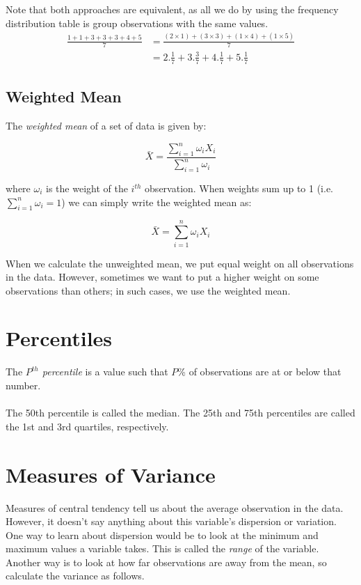 \documentclass{./../../Latex/handout}
\begin{document}
 Note that both approaches are equivalent, as all we do by using the frequency distribution table is group observations with the same values. 
 \begin{align*}
 	\frac{1+1+3+3+3+4+5}{7} &= \frac{(2\times 1)+(3\times 3)+(1\times 4)+(1 \times 5)}{7} \\
 	&= 2.\frac{1}{7} + 3.\frac{3}{7} + 4.\frac{1}{7}+ 5.\frac{1}{7}
 \end{align*}


\subsection*{Weighted Mean}
The \textit{weighted mean} of a set of data is given by:

$$ \bar{X} = \frac{\sum_{i=1}^n\omega_i X_i}{\sum_{i=1}^n \omega_i} $$

where $\omega_i$ is the weight of the $i^{th}$ observation. When weights sum up to 1 (i.e. \(\sum_{i=1}^n \omega_i=1\)) we can simply write the weighted mean as:

$$ \bar{X} = \sum_{i=1}^n\omega_i X_i$$ 

When we calculate the unweighted mean, we put equal weight on all observations in the data. However, sometimes we want to put a higher weight on some observations than others; in such cases, we use the weighted mean. 


\section{Percentiles}
The \textit{$P^{th}$ percentile} is a value such that $P$\% of observations are at or below that number. \\~\\
The 50th percentile is called the median. The 25th and 75th percentiles are called the 1st and 3rd quartiles, respectively.

\section{Measures of Variance}

Measures of central tendency tell us about the average observation in the data. However, it doesn't say anything about this variable's dispersion or variation. One way to learn about dispersion would be to look at the minimum and maximum values a variable takes. This is called the \textit{range} of the variable. Another way is to look at how far observations are away from the mean, so calculate the variance as follows. \\
\end{document}
